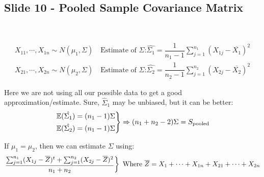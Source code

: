\subsection{Slide 10 - Pooled Sample Covariance Matrix}\hfill\\\par
\begin{equation*}
  \begin{gathered}
    X_{11}, \cdots, X_{1n}\sim N(\mu_1,\Sigma)\quad\text{Estimate of $\Sigma$:} \hat{\Sigma_1} = \dfrac{1}{n_1-1}\sum_{j=1}^{n_1}(X_{1j}-\overline{X_1})^2\\
    X_{21}, \cdots, X_{2n}\sim N(\mu_2,\Sigma)\quad\text{Estimate of $\Sigma$:} \hat{\Sigma_2} = \dfrac{1}{n_2-1}\sum_{j=1}^{n_2}(X_{2j}-\overline{X_2})^2
  \end{gathered}
\end{equation*}
\par\bigskip
\noindent Here we are not using all our possible data to get a good approximation/estimate. Sure, $\hat{\Sigma}_1$ may be unbiased, but it can be better:
\begin{equation*}
  \begin{gathered}
    \begin{rcases*}
      \E(\hat{\Sigma_1}) = (n_1-1)\Sigma\\
      \E(\hat{\Sigma_2}) = (n_1-1)\Sigma
    \end{rcases*}\Rightarrow (n_1+n_2-2)\Sigma=S_{\text{pooled}}
  \end{gathered}
\end{equation*}
\par\bigskip
\noindent If $\mu_1=\mu_2$, then we can estimate $\Sigma$ using:
\begin{equation*}
  \begin{gathered}
    \begin{rcases*}
      \dfrac{\sum_{j=1}^{n_1}(X_{1j}-\overline{Z})^t+\sum_{j=1}^{n_2}(X_{2j}-\overline{Z})^2}{n_1+n_2}
    \end{rcases*}\text{ Where $\overline{Z} = X_1+\cdots+X_{1n}+X_{21}+\cdots+X_{2n}$}
  \end{gathered}
\end{equation*}
